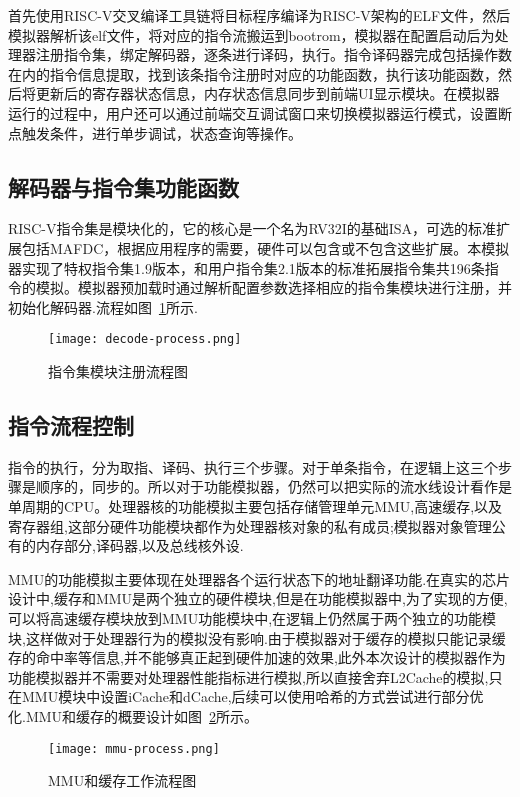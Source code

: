 首先使用RISC-V交叉编译工具链将目标程序编译为RISC-V架构的ELF文件，然后模拟器解析该elf文件，将对应的指令流搬运到bootrom，模拟器在配置启动后为处理器注册指令集，绑定解码器，逐条进行译码，执行。指令译码器完成包括操作数在内的指令信息提取，找到该条指令注册时对应的功能函数，执行该功能函数，然后将更新后的寄存器状态信息，内存状态信息同步到前端UI显示模块。在模拟器运行的过程中，用户还可以通过前端交互调试窗口来切换模拟器运行模式，设置断点触发条件，进行单步调试，状态查询等操作。

\subsection{解码器与指令集功能函数}
RISC-V指令集是模块化的，它的核心是一个名为RV32I的基础ISA，可选的标准扩展包括MAFDC，根据应用程序的需要，硬件可以包含或不包含这些扩展。本模拟器实现了特权指令集1.9版本，和用户指令集2.1版本的标准拓展指令集共196条指令的模拟。模拟器预加载时通过解析配置参数选择相应的指令集模块进行注册，并初始化解码器.流程如图~\ref{fig:decode-process}所示.
\begin{figure}[h]
  \centering
  \texttt{[image: decode-process.png]}
  \caption{指令集模块注册流程图}
  \label{fig:decode-process}
\end{figure}


\subsection{指令流程控制}
指令的执行，分为取指、译码、执行三个步骤。对于单条指令，在逻辑上这三个步骤是顺序的，同步的。所以对于功能模拟器，仍然可以把实际的流水线设计看作是单周期的CPU。处理器核的功能模拟主要包括存储管理单元MMU,高速缓存,以及寄存器组,这部分硬件功能模块都作为处理器核对象的私有成员;模拟器对象管理公有的内存部分,译码器,以及总线核外设.


MMU的功能模拟主要体现在处理器各个运行状态下的地址翻译功能.在真实的芯片设计中,缓存和MMU是两个独立的硬件模块,但是在功能模拟器中,为了实现的方便,可以将高速缓存模块放到MMU功能模块中,在逻辑上仍然属于两个独立的功能模块,这样做对于处理器行为的模拟没有影响.由于模拟器对于缓存的模拟只能记录缓存的命中率等信息,并不能够真正起到硬件加速的效果,此外本次设计的模拟器作为功能模拟器并不需要对处理器性能指标进行模拟,所以直接舍弃L2Cache的模拟,只在MMU模块中设置iCache和dCache,后续可以使用哈希的方式尝试进行部分优化.MMU和缓存的概要设计如图~\ref{fig:mmu-process}所示。
\begin{figure}[h]
  \centering
  \texttt{[image: mmu-process.png]}
  \caption{MMU和缓存工作流程图}
  \label{fig:mmu-process}
\end{figure}

